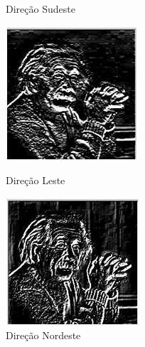 \documentclass[a4paper, 12pt]{article}
\begin{document}
\begin{figure}[!htbp]
	  	\caption{Direção Sudeste}
	\endminipage\hspace{1cm}
		\includegraphics[width=\linewidth]{images/kirsch8.jpg}
		\caption{Direção Leste}
  	\endminipage\hspace{1cm}
  		\includegraphics[width=\linewidth]{images/kirsch9.jpg}
  		\caption{Direção Nordeste}
	\endminipage
\end{figure}
\vspace{3cm}
\end{document}
